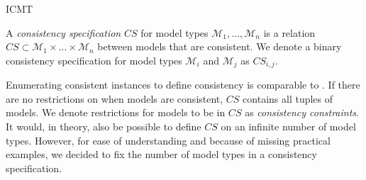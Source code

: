 \begin{copiedFrom}{ICMT}
\begin{definition}
\label{def:consistency_specification}
A \emph{consistency specification} $\mathit{CS}$ for model types $\mathcal{M}_1, \ldots, \mathcal{M}_n$ is a relation $\mathit{CS} \subset \mathcal{M}_1 \times \ldots \times \mathcal{M}_n$ between models that are consistent. 
We denote a binary consistency specification for model types $\mathcal{M}_i$ and $\mathcal{M}_j$ as $\mathit{CS}_{i,j}$.
\end{definition}


Enumerating consistent instances to define consistency is comparable to \cite{stevens2017a}.
If there are no restrictions on when models are consistent, %
$\mathit{CS}$ %
contains all tuples of models.
We denote restrictions for models to be in $\mathit{CS}$ as \emph{consistency constraints}.
It would, in theory, also be possible to define $\mathit{CS}$ on an infinite number of model types. However, for ease of understanding and because of missing practical examples, we decided to fix the number of model types in a consistency specification.


\end{copiedFrom}
